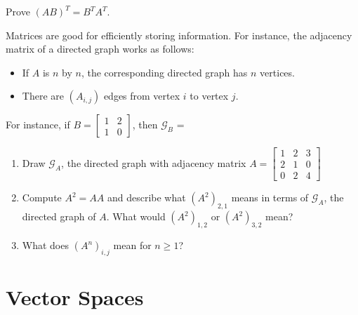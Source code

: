 \bq
Prove $(AB)^T=B^T A^T$.
\eq
\begin{annotation}
\end{annotation}
\bq Matrices are good for efficiently storing information. For instance, the adjacency matrix of a directed graph works as follows:
\begin{itemize}
\item If $A$ is $n$ by $n$, the corresponding directed graph has $n$ vertices.
\item There are $(A_{i,j})$ edges from vertex $i$ to vertex $j$.
\end{itemize}
For instance, if $B = \left[ \begin{array}{ccc} 1 & 2 \\
                                    1 & 0 \end{array} \right] $, then $\mathcal G_B$ = \quad \quad {}
\begin{enumerate}
\item Draw $\mathcal G_A$, the directed graph with adjacency matrix $A = \left[ \begin{array}{ccc} 1 & 2 &3\\ 2& 1 & 0\\0 &2&4 \end{array} \right] $
\item Compute $A^2=AA$ and describe what $(A^2)_{2,1}$ means in terms of $\mathcal G_A$, the directed graph of $A$. What would $(A^2)_{1,2}$ or $(A^2)_{3,2}$ mean?
\item What does $(A^n)_{i,j}$ mean for $n \geq 1$?
\end{enumerate}
\eq

\chapter{Vector Spaces}


